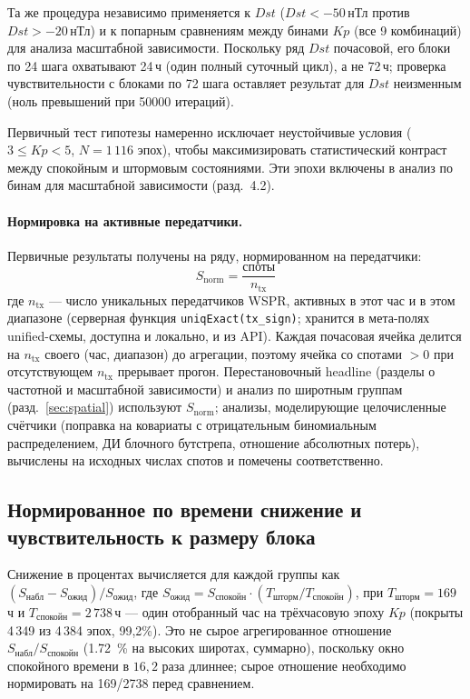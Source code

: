 \documentclass{agujournal2019}
\begin{document}
Та же процедура независимо применяется к $Dst$ ($Dst < -50$\,нТл против
$Dst > -20$\,нТл) и к попарным сравнениям между бинами $Kp$ (все 9
комбинаций) для анализа масштабной зависимости. Поскольку ряд $Dst$
почасовой, его блоки по 24 шага охватывают 24\,ч (один полный суточный
цикл), а не 72\,ч; проверка чувствительности с блоками по 72 шага
оставляет результат для $Dst$ неизменным (ноль превышений при
\num{50000} итераций).

Первичный тест гипотезы намеренно исключает неустойчивые условия
($3 \leq Kp < 5$, $N = 1\,116$ эпох), чтобы максимизировать статистический
контраст между спокойным и штормовым состояниями. Эти эпохи включены
в анализ по бинам для масштабной зависимости (разд.~4.2).

\paragraph{Нормировка на активные передатчики.} Первичные результаты
получены на ряду, нормированном на передатчики:
\begin{equation}
	S_{\mathrm{norm}} = \frac{\mbox{споты}}{n_{\mathrm{tx}}}
	\label{eq:normtx}
\end{equation}
где $n_{\mathrm{tx}}$ — число уникальных передатчиков WSPR,
активных в этот час и в этом диапазоне (серверная функция
\texttt{uniqExact(tx\_sign)}; хранится в мета-полях unified-схемы,
доступна и локально, и из API). Каждая почасовая ячейка
делится на $n_{\mathrm{tx}}$ своего (час, диапазон) до
агрегации, поэтому ячейка со спотами $>0$ при отсутствующем
$n_{\mathrm{tx}}$ прерывает прогон. Перестановочный headline
(разделы о частотной и масштабной зависимости) и анализ по
широтным группам (разд.~\ref{sec:spatial}) используют
$S_{\mathrm{norm}}$; анализы, моделирующие целочисленные счётчики
(поправка на ковариаты с отрицательным биномиальным
распределением, ДИ блочного бутстрепа, отношение абсолютных
потерь), вычислены на исходных числах спотов и помечены
соответственно.

\subsection{Нормированное по времени снижение и чувствительность к размеру блока}
\label{sec:dropnorm}

Снижение в процентах вычисляется для каждой группы как
$(S_{\text{набл}} - S_{\text{ожид}}) / S_{\text{ожид}}$, где
$S_{\text{ожид}} = S_{\text{спокойн}} \cdot (T_{\text{шторм}} /
T_{\text{спокойн}})$, при $T_{\text{шторм}} = 169$\,ч и
$T_{\text{спокойн}} = 2\,738$\,ч --- один отобранный час на
трёхчасовую эпоху $Kp$ (покрыты 4\,349 из 4\,384 эпох, 99,2\%).
Это не сырое агрегированное отношение
$S_{\text{набл}} / S_{\text{спокойн}}$ (\SI{1,72}{\percent} на
высоких широтах, суммарно), поскольку окно спокойного времени в
$16,2$ раза длиннее; сырое отношение необходимо нормировать на
169/2738 перед сравнением.
\end{document}
